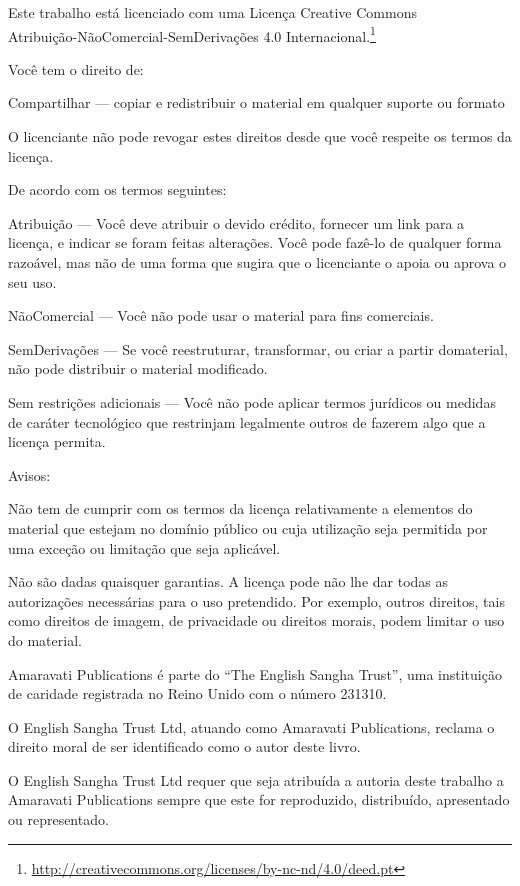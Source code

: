 \cleartorecto
\thispagestyle{chapter}
{\copyrightsize\setlength{\parindent}{0pt}%
\raggedright\label{copyright-details}
\setlength{\parskip}{7pt}

{\centering

{\LARGE\ccbyncnd}

Este trabalho está licenciado com uma Licença Creative Commons\\
Atribuição-NãoComercial-SemDerivações 4.0 Internacional.\footnote{%
\href{http://creativecommons.org/licenses/by-nc-nd/4.0/deed.pt}{http://creativecommons.org/licenses/by-nc-nd/4.0/deed.pt}}

}

Você tem o direito de:

\begin{packeditemize}
\item Compartilhar — copiar e redistribuir o material em qualquer suporte ou formato
\end{packeditemize}

O licenciante não pode revogar estes direitos desde que você respeite os termos da licença.

De acordo com os termos seguintes:

\begin{packeditemize}
\item Atribuição — Você deve atribuir o devido crédito, fornecer um link para a licença, e indicar se foram feitas alterações. Você pode fazê-lo de qualquer forma razoável, mas não de uma forma que sugira que o licenciante o apoia ou aprova o seu uso.
\item NãoComercial — Você não pode usar o material para fins comerciais.
\item SemDerivações — Se você reestruturar, transformar, ou criar a partir domaterial, não pode distribuir o material modificado.
\end{packeditemize}

Sem restrições adicionais — Você não pode aplicar termos jurídicos ou medidas de caráter tecnológico que restrinjam legalmente outros de fazerem algo que a licença permita.

Avisos:

Não tem de cumprir com os termos da licença relativamente a elementos do material que estejam no domínio público ou cuja utilização seja permitida por uma exceção ou limitação que seja aplicável.

Não são dadas quaisquer garantias. A licença pode não lhe dar todas as autorizações necessárias para o uso pretendido. Por exemplo, outros direitos, tais como direitos de imagem, de privacidade ou direitos morais, podem limitar o uso do material.

Amaravati Publications é parte do ``The English Sangha Trust'', uma
instituição de caridade registrada no Reino Unido com o número 231310.

O English Sangha Trust Ltd, atuando como Amaravati Publications, reclama
o direito moral de ser identiﬁcado como o autor deste livro.

O English Sangha Trust Ltd requer que seja atribuída a autoria deste
trabalho a Amaravati Publications sempre que este for reproduzido,
distribuído, apresentado ou representado.

}
